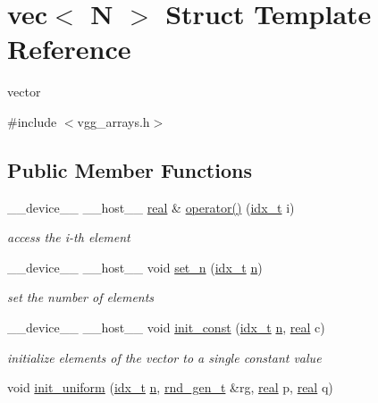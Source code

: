 \hypertarget{structvec}{}\section{vec$<$ N $>$ Struct Template Reference}
\label{structvec}


vector  




{\ttfamily \#include $<$vgg\+\_\+arrays.\+h$>$}

\subsection*{Public Member Functions}
\begin{DoxyCompactItemize}
\item 
\+\_\+\+\_\+device\+\_\+\+\_\+ \+\_\+\+\_\+host\+\_\+\+\_\+ \hyperlink{vgg__util_8h_a1082d08aaa761215ec83e7149f27ad16}{real} \& \hyperlink{structvec_ad73089ab6c3f3fae0b233bb16920ce5d}{operator()} (\hyperlink{vgg__util_8h_a8e93478a00e685bea5e6a3f617bf03a3}{idx\+\_\+t} i)
\begin{DoxyCompactList}\small\item\em access the i-\/th element \end{DoxyCompactList}\item 
\+\_\+\+\_\+device\+\_\+\+\_\+ \+\_\+\+\_\+host\+\_\+\+\_\+ void \hyperlink{structvec_a90d5638b2de8e3a87d954130dc6d505e}{set\+\_\+n} (\hyperlink{vgg__util_8h_a8e93478a00e685bea5e6a3f617bf03a3}{idx\+\_\+t} \hyperlink{structvec_a8e2947aa75530f74cac781347dd97e98}{n})
\begin{DoxyCompactList}\small\item\em set the number of elements \end{DoxyCompactList}\item 
\+\_\+\+\_\+device\+\_\+\+\_\+ \+\_\+\+\_\+host\+\_\+\+\_\+ void \hyperlink{structvec_ac4159809d118cd6c25bae8e17b49360a}{init\+\_\+const} (\hyperlink{vgg__util_8h_a8e93478a00e685bea5e6a3f617bf03a3}{idx\+\_\+t} \hyperlink{structvec_a8e2947aa75530f74cac781347dd97e98}{n}, \hyperlink{vgg__util_8h_a1082d08aaa761215ec83e7149f27ad16}{real} c)
\begin{DoxyCompactList}\small\item\em initialize elements of the vector to a single constant value \end{DoxyCompactList}\item 
void \hyperlink{structvec_a7e46dfbdf97ef4fa6403ed7bea437c76}{init\+\_\+uniform} (\hyperlink{vgg__util_8h_a8e93478a00e685bea5e6a3f617bf03a3}{idx\+\_\+t} \hyperlink{structvec_a8e2947aa75530f74cac781347dd97e98}{n}, \hyperlink{structrnd__gen__t}{rnd\+\_\+gen\+\_\+t} \&rg, \hyperlink{vgg__util_8h_a1082d08aaa761215ec83e7149f27ad16}{real} p, \hyperlink{vgg__util_8h_a1082d08aaa761215ec83e7149f27ad16}{real} q)

\end{DoxyCompactItemize}
